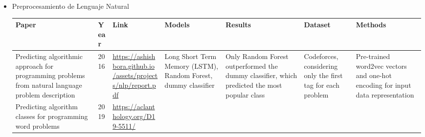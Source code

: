 \documentclass{article}
\begin{document}
\begin{itemize}
    \item Preprocesamiento de Lenguaje Natural
          
          \begin{longtable}{|p{2cm}|p{0.8cm}|p{2cm}|p{2cm}|p{3cm}|p{2cm}|p{3cm}|}
              \hline
              \textbf{Paper} & \textbf{Year}                                                                                                                                                       & \textbf{Link} & \textbf{Models} & \textbf{Results} & \textbf{Dataset} & \textbf{Methods} \\
              \hline
              \endfirsthead
              
              \hline
              \endfoot
              
              \hline
              \endlastfoot
              
              
              Predicting algorithmic approach for programming problems from natural language problem description 
                             & 2016 
                             & \href{https://ashishbora.github.io/assets/projects/nlp/report.pdf}{\url{https://ashishbora.github.io/assets/projects/nlp/report.pdf}}

              
              
              
              
              
                             & Long Short Term Memory (LSTM), Random Forest, dummy classifier 
                             & Only Random Forest outperformed the dummy classifier, which predicted the most popular class 
                             & Codeforces, considering only the first tag for each problem 
                             & Pre-trained word2vec vectors and one-hot encoding for input data representation                                                                                                                                                                                \\
              
              \hline
              Predicting algorithm classes for programming word problems
                             & 2019
                             & \href{https://aclanthology.org/D19-5511/}{\url{https://aclanthology.org/D19-5511/}}

              
              
              
              

\end{longtable}
\end{itemize}
\end{document}
